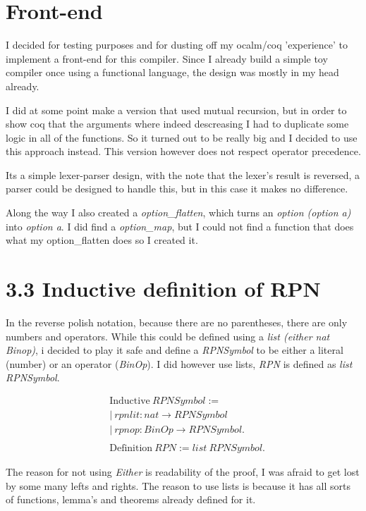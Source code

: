 \documentclass[10pt,a4paper,usenames,dvipnames]{article}
\begin{document}
\section*{ Front-end }
I decided for testing purposes and for dusting off my ocalm/coq 'experience' to implement a front-end for this compiler.
Since I already build a simple toy compiler once using a functional language, the design was mostly in my head already.

I did at some point make a version that used mutual recursion, but in order to show coq that the arguments where indeed descreasing I had to duplicate some logic in all of the functions. So it turned out to be really big and I decided to use
this approach instead. This version however does not respect operator precedence.

Its a simple lexer-parser design, with the note that the lexer's result is reversed, a parser could be designed to handle this, but in this case it makes no difference.

Along the way I also created a \emph{option\_flatten}, which turns an \emph{option (option a)} into \emph{option a}. I did find a \emph{option\_map}, but I could not find a function that does what my option\_flatten does so I created it.

\section*{3.3 Inductive definition of RPN }

In the reverse polish notation, because there are no parentheses, there are only numbers and operators. While this could be defined using a \emph{list (either nat Binop)}, i decided to play it safe and define a \emph{RPNSymbol} to be either a literal (number) or an operator (\emph{BinOp}). I did however use lists, \emph{RPN} is defined as \emph{list RPNSymbol}.

\begin{align*}
& \text{Inductive} \: RPNSymbol := \\
& | \: rpnlit : nat \rightarrow RPNSymbol \\
& | \: rpnop : BinOp \rightarrow RPNSymbol. \\
\\
& \text{Definition} \: RPN := list \: RPNSymbol.
\end{align*}

The reason for not using \emph{Either} is readability of the proof, I was afraid to get lost by some many lefts and rights. The reason to use lists is because it has all sorts of functions, lemma's and theorems already defined for it.
\end{document}
